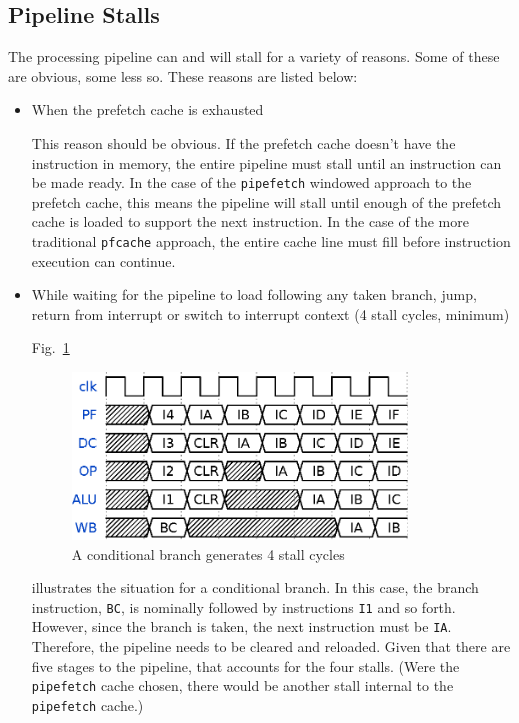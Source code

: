 \documentclass{gqtekspec}
\begin{document}
\subsection{Pipeline Stalls}
The processing pipeline can and will stall for a variety of reasons.  Some of
these are obvious, some less so.  These reasons are listed below:
\begin{itemize}
\item When the prefetch cache is exhausted

This reason should be obvious.  If the prefetch cache doesn't have the
instruction in memory, the entire pipeline must stall until an instruction
can be made ready.  In the case of the {\tt pipefetch} windowed approach
to the prefetch cache, this means the pipeline will stall until enough of the
prefetch cache is loaded to support the next instruction.  In the case
of the more traditional {\tt pfcache} approach, the entire cache line must
fill before instruction execution can continue.

\item While waiting for the pipeline to load following any taken branch, jump,
	return from interrupt or switch to interrupt context (4 stall cycles,
	minimum)

Fig.~\ref{fig:bcstalls}
\begin{figure}\begin{center}
\includegraphics[width=3.5in]{../gfx/bc.eps}
\caption{A conditional branch generates 4 stall cycles}\label{fig:bcstalls}
\end{center}\end{figure}
illustrates the situation for a conditional branch.  In this case, the branch
instruction, {\tt BC}, is nominally followed by instructions {\tt I1} and so
forth.  However, since the branch is taken, the next instruction must be
{\tt IA}.  Therefore, the pipeline needs to be cleared and reloaded.
Given that there are five stages to the pipeline, that accounts
for the four stalls.  (Were the {\tt pipefetch} cache chosen, there would
be another stall internal to the {\tt pipefetch} cache.)


\end{itemize}
\end{document}
